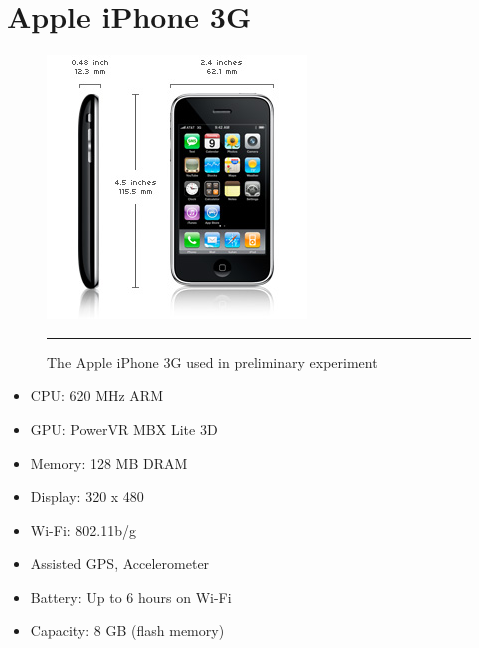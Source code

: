 \chapter{Apple iPhone 3G}
\label{AppendixE}

\begin{figure}[htbp]
  \centering
    \includegraphics{./Primitives/iphone.jpg}
    \rule{35em}{0.5pt}
  \caption[Apple iPhone 3G]{The Apple iPhone 3G used in preliminary experiment}
\end{figure}

\begin{itemize}
	\item CPU: 620 MHz ARM
	\item GPU: PowerVR MBX Lite 3D
	\item Memory: 128 MB DRAM
	\item Display: 320 x 480
	\item Wi-Fi: 802.11b/g
	\item Assisted GPS, Accelerometer
	\item Battery: Up to 6 hours on Wi-Fi
	\item Capacity: 8 GB (flash memory)
\end{itemize}
